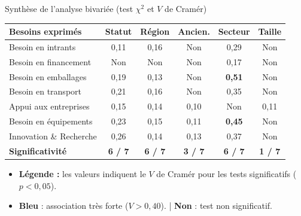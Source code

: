 \documentclass[aspectratio=169, 10pt]{beamer}
\begin{document}
\begin{frame}{Synthèse de l'analyse bivariée (test $\chi^2$ et $V$ de Cramér)}
    \begin{center}
        \scriptsize
        \renewcommand{\arraystretch}{1.2}
        \begin{tabular}{l|ccccc}
            \toprule
            \textbf{Besoins exprimés} & \textbf{Statut} & \textbf{Région} & \textbf{Ancien.} & \textbf{Secteur} & \textbf{Taille} \\
            \midrule
            Besoin en intrants & \cellcolor{green!15}0,11 & \cellcolor{green!15}0,16 & Non & \cellcolor{green!15}0,29 & Non \\
            \rowcolor{gray!5}
            Besoin en financement & Non & Non & Non & \cellcolor{green!15}0,17 & Non \\
            Besoin en emballages & \cellcolor{green!15}0,19 & \cellcolor{green!15}0,13 & Non & \cellcolor{blue!15}\textbf{0,51} & Non \\
            \rowcolor{gray!5}
            Besoin en transport & \cellcolor{green!15}0,21 & \cellcolor{green!15}0,16 & Non & \cellcolor{green!15}0,35 & Non \\
            Appui aux entreprises & \cellcolor{green!15}0,15 & \cellcolor{green!15}0,14 & \cellcolor{green!10}0,10 & Non & \cellcolor{green!10}0,11 \\
            \rowcolor{gray!5}
            Besoin en équipements & \cellcolor{green!15}0,23 & \cellcolor{green!15}0,15 & \cellcolor{green!10}0,11 & \cellcolor{blue!15}\textbf{0,45} & Non \\
            Innovation \& Recherche & \cellcolor{green!15}0,26 & \cellcolor{green!15}0,14 & \cellcolor{green!10}0,13 & \cellcolor{green!15}0,37 & Non \\
            \midrule
            \textbf{Significativité} & \textbf{6 / 7} & \textbf{6 / 7} & \textbf{3 / 7} & \textbf{6 / 7} & \textbf{1 / 7} \\
            \bottomrule
        \end{tabular}
    \end{center}
    \vfill
    \begin{itemize}
        \item \tiny \textbf{Légende :} les valeurs indiquent le $V$ de Cramér pour les tests significatifs ($p < 0,05$).
        \item \tiny \color{blue!80}\textbf{Bleu} : association très forte ($V > 0,40$). \color{black} | \color{gray}\textbf{Non} : test non significatif.
    \end{itemize}
\end{frame}
\end{document}
